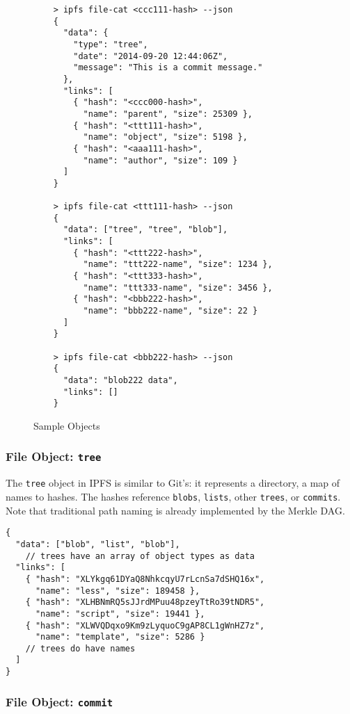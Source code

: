 \documentclass{sig-alternate}
\begin{document}
\begin{figure}
\begin{verbatim}
    > ipfs file-cat <ccc111-hash> --json
    {
      "data": {
        "type": "tree",
        "date": "2014-09-20 12:44:06Z",
        "message": "This is a commit message."
      },
      "links": [
        { "hash": "<ccc000-hash>",
          "name": "parent", "size": 25309 },
        { "hash": "<ttt111-hash>",
          "name": "object", "size": 5198 },
        { "hash": "<aaa111-hash>",
          "name": "author", "size": 109 }
      ]
    }

    > ipfs file-cat <ttt111-hash> --json
    {
      "data": ["tree", "tree", "blob"],
      "links": [
        { "hash": "<ttt222-hash>",
          "name": "ttt222-name", "size": 1234 },
        { "hash": "<ttt333-hash>",
          "name": "ttt333-name", "size": 3456 },
        { "hash": "<bbb222-hash>",
          "name": "bbb222-name", "size": 22 }
      ]
    }

    > ipfs file-cat <bbb222-hash> --json
    {
      "data": "blob222 data",
      "links": []
    }
\end{verbatim}
\caption{Sample Objects} \label{fig:sample-objects}
\end{figure}


\subsubsection{File Object: \texttt{tree}}

The \texttt{tree} object in IPFS is similar to Git's: it represents a
directory, a map of names to hashes. The hashes reference \texttt{blobs}, \texttt{lists}, other \texttt{trees}, or \texttt{commits}. Note that traditional path naming is already implemented by the Merkle DAG.

\begin{verbatim}
{
  "data": ["blob", "list", "blob"],
    // trees have an array of object types as data
  "links": [
    { "hash": "XLYkgq61DYaQ8NhkcqyU7rLcnSa7dSHQ16x",
      "name": "less", "size": 189458 },
    { "hash": "XLHBNmRQ5sJJrdMPuu48pzeyTtRo39tNDR5",
      "name": "script", "size": 19441 },
    { "hash": "XLWVQDqxo9Km9zLyquoC9gAP8CL1gWnHZ7z",
      "name": "template", "size": 5286 }
    // trees do have names
  ]
}
\end{verbatim}


\subsubsection{File Object: \texttt{commit}}
\end{document}
